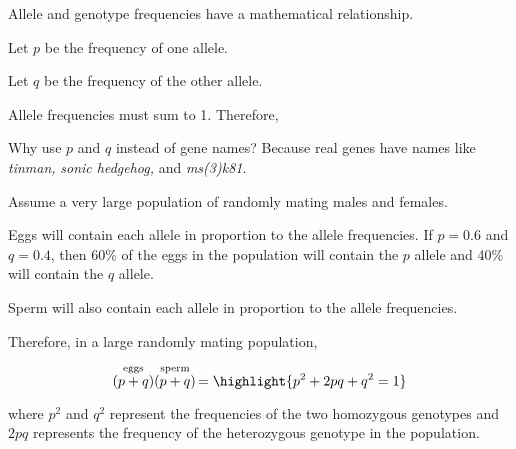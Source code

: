 \documentclass[t]{beamer}
\begin{document}
\begin{frame}[t]{Allele and genotype frequencies have a mathematical relationship.}
	
	\hangpara Let $p$ be the frequency of one allele.
	
	\hangpara Let $q$ be the frequency of the other allele.
	
	\hangpara Allele frequencies must sum to 1. Therefore,
	
	\highlight{\[ p + q = 1.\]}
	
	\pause
	
	\vspace{\baselineskip}
	
	\hangpara {} Why use $p$ and $q$ instead of gene names?  Because real genes have names like \emph{tinman,} \emph{sonic hedgehog,} and \emph{ms(3)k81}.
\end{frame}
%
\begin{frame}[t]{Assume a very large population of randomly mating males and females.}

	\hangpara Eggs will contain each allele in proportion to the allele frequencies. If $p = 0.6$ and $q = 0.4$, then 60\% of the eggs in the population will contain the $p$ allele and 40\% will contain the $q$ allele.
	
	\hangpara Sperm will also contain each allele in proportion to the allele frequencies. 
	
	\hangpara Therefore, in a large randomly mating population, 
	
	\[ \stackrel{\text{eggs}}{(p + q)}
	\stackrel{\text{sperm}}{(p + q)}\, 
	= \highlight{p^2 + 2pq + q^2 = 1} \]
	
	\hangpara where $p^2$ and $q^2$ represent the frequencies of the two homozygous genotypes and $2pq$ represents the frequency of the heterozygous genotype in the population.
\end{frame}
%
{
\begin{frame}[c]%

\centering
{}
\end{frame}
}
\end{document}
